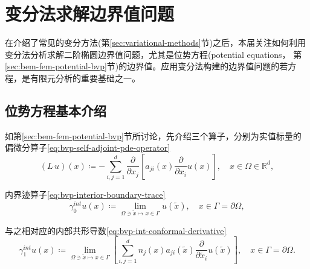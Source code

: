 \section{变分法求解边界值问题}
\label{sec:variational-bvp}

在介绍了常见的变分方法(第\ref{sec:variational-methods}节)之后，本届关注如何利用变分法分析求解二阶椭圆边界值问题，尤其是位势方程(potential equations， 第\ref{sec:bem-fem-potential-bvp}节)的边界值。应用变分法构建的边界值问题的若方程，是有限元分析的重要基础之一。

\subsection{位势方程基本介绍}
\label{sec:var-bvp-potential-equation}

如第\ref{sec:bem-fem-potential-bvp}节所讨论，先介绍三个算子，分别为实值标量的偏微分算子\eqref{eq:bvp-self-adjoint-pde-operator}
\begin{equation}
  \label{eq:var-bvp-self-adjoint-pde-operator}
  \left( L \, u \right)(x) \coloneqq - \sum_{i,j=1}^d \frac{\partial}{\partial x_j} \left[ a_{ji} (x) \frac{\partial}{\partial x_i} u(x)\right], \quad x \in \Omega \in \mathbb{R}^d,
\end{equation}

内界迹算子\eqref{eq:bvp-interior-boundary-trace}
\begin{equation*}
  \gamma_0^{int} u(x) \coloneqq \lim_{\Omega \owns \tilde{x} \mapsto x \in \Gamma} u \left( \tilde{x} \right), \quad x \in \Gamma = \partial \Omega,
\end{equation*}

与之相对应的内部共形导数\eqref{eq:bvp-int-conformal-derivative}
\begin{equation}
  \label{eq:var-bvp-int-conformal-derivative}
  \gamma_1^{int}u(x) \coloneqq \lim_{\Omega \owns \tilde{x} \mapsto x \in \Gamma} \left[
\sum_{i,j=1}^{d} n_j(x) a_{ji}\left( \tilde{x} \right) \frac{\partial}{\partial \tilde{x}_i} u \left( \tilde{x} \right)
  \right], \quad x \in \Gamma = \partial \Omega.
\end{equation}

